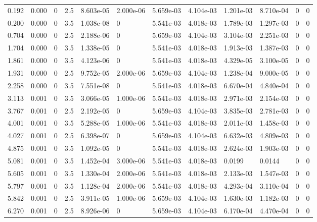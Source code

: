 \documentclass[preview]{standalone}
\begin{document}
{{\begin{tabular}{L{1.2cm}C{1.2cm} C{0.3cm}C{0.5cm} C{1.4cm}C{1.4cm} C{1.4cm}C{1.4cm} C{1.6cm}C{1.6cm} C{1.6cm}C{1.6cm}}
  0.192  &  0.000  & 0     & 2.5 &  8.603e-05  & 2.000e-06  &  5.659e-03&   4.104e-03& 1.201e-03 & 8.710e-04   &  0 & 0  \\ 
  0.200  &  0.000  & 0     & 3.5 &  1.038e-08  & 0  &  5.541e-03&   4.018e-03& 1.789e-03 & 1.297e-03   &  0 & 0  \\ 
  0.704  &  0.000  & 0     & 2.5 &  2.188e-06  & 0  &  5.659e-03&   4.104e-03& 3.104e-03 & 2.251e-03   &  0 & 0  \\ 
  1.704  &  0.000  & 0     & 3.5 &  1.338e-05  & 0  &  5.541e-03&   4.018e-03& 1.913e-03 & 1.387e-03   &  0 & 0  \\ 
  1.861  &  0.000  & 0     & 3.5 &  4.123e-06  & 0  &  5.541e-03&   4.018e-03& 4.329e-05 & 3.100e-05   &  0 & 0  \\ 
  1.931  &  0.000  & 0     & 2.5 &  9.752e-05  & 2.000e-06  &  5.659e-03&   4.104e-03& 1.238e-04 & 9.000e-05   &  0 & 0  \\ 
  2.258  &  0.000  & 0     & 3.5 &  7.551e-08  & 0  &  5.541e-03&   4.018e-03& 6.670e-04 & 4.840e-04   &  0 & 0  \\ 
  3.113  &  0.001  & 0     & 3.5 &  3.066e-05  & 1.000e-06  &  5.541e-03&   4.018e-03& 2.971e-03 & 2.154e-03   &  0 & 0  \\ 
  3.767  &  0.001  & 0     & 2.5 &  2.192e-05  & 0  &  5.659e-03&   4.104e-03& 3.835e-03 & 2.781e-03   &  0 & 0  \\ 
  4.001  &  0.001  & 0     & 3.5 &  5.288e-05  & 1.000e-06  &  5.541e-03&   4.018e-03& 2.011e-03 & 1.458e-03   &  0 & 0  \\ 
  4.027  &  0.001  & 0     & 2.5 &  6.398e-07  & 0  &  5.659e-03&   4.104e-03& 6.632e-03 & 4.809e-03   &  0 & 0  \\ 
  4.875  &  0.001  & 0     & 3.5 &  1.092e-05  & 0  &  5.541e-03&   4.018e-03& 2.624e-03 & 1.903e-03   &  0 & 0  \\ 
  5.081  &  0.001  & 0     & 3.5 &  1.452e-04  & 3.000e-06  &  5.541e-03&   4.018e-03& 0.0199 & 0.0144   &  0 & 0  \\ 
  5.605  &  0.001  & 0     & 3.5 &  1.330e-04  & 2.000e-06  &  5.541e-03&   4.018e-03& 2.133e-03 & 1.547e-03   &  0 & 0  \\ 
  5.797  &  0.001  & 0     & 3.5 &  1.128e-04  & 2.000e-06  &  5.541e-03&   4.018e-03& 4.293e-04 & 3.110e-04   &  0 & 0  \\ 
  5.842  &  0.001  & 0     & 2.5 &  3.911e-05  & 1.000e-06  &  5.659e-03&   4.104e-03& 1.630e-03 & 1.182e-03   &  0 & 0  \\ 
  6.270  &  0.001  & 0     & 2.5 &  8.926e-06  & 0  &  5.659e-03&   4.104e-03& 6.170e-04 & 4.470e-04   &  0 & 0  \\ 

\end{tabular}}}
\end{document}
